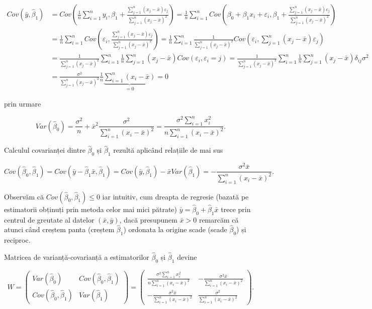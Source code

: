 \documentclass[]{article}
\begin{document}
\begin{align*}
Cov(\bar y, \hat \beta_1) &= Cov\left(\frac{1}{n}\sum_{i = 1}^{n}y_i, \beta_1 + \frac{\sum_{j = 1}^{n}(x_j - \bar x)\varepsilon_j}{\sum_{j = 1}^{n}(x_j - \bar x)^2} \right) = \frac{1}{n}\sum_{i = 1}^{n}Cov\left(\beta_0 + \beta_1 x_i + \varepsilon_i, \beta_1 + \frac{\sum_{j = 1}^{n}(x_j - \bar x)\varepsilon_j}{\sum_{j = 1}^{n}(x_j - \bar x)^2}\right)\\
&= \frac{1}{n}\sum_{i = 1}^{n}Cov\left(\varepsilon_i, \frac{\sum_{j = 1}^{n}(x_j - \bar x)\varepsilon_j}{\sum_{j = 1}^{n}(x_j - \bar x)^2}\right) = \frac{1}{n}\sum_{i = 1}^{n}\frac{1}{\sum_{j = 1}^{n}(x_j - \bar x)^2}Cov\left(\varepsilon_i, \sum_{j = 1}^{n}(x_j - \bar x)\varepsilon_j\right)\\
&= \frac{1}{\sum_{j = 1}^{n}(x_j - \bar x)^2}\sum_{i = 1}^{n}\frac{1}{n}\sum_{j = 1}^{n}(x_j - \bar x)Cov(\varepsilon_i, \varepsilon_i=j) = \frac{1}{\sum_{j = 1}^{n}(x_j - \bar x)^2}\sum_{i = 1}^{n}\frac{1}{n}\sum_{j = 1}^{n}(x_j - \bar x)\delta_{ij}\sigma^2\\
&= \frac{\sigma^2}{\sum_{j = 1}^{n}(x_j - \bar x)^2}\frac{1}{n}\underbrace{\sum_{i = 1}^{n}(x_i - \bar x)}_{=0} = 0
\end{align*}

prin urmare

\[
Var(\hat \beta_0) = \frac{\sigma^2}{n} + \bar x^2 \frac{\sigma^2}{\sum_{i = 1}^{n}(x_i - \bar x)^2} = \frac{\sigma^2\sum_{i = 1}^{n}x_i^2}{n\sum_{i = 1}^{n}(x_i - \bar x)^2}.
\]

Calculul covarianței dintre \(\hat \beta_0\) și \(\hat \beta_1\) rezultă
aplicând relațiile de mai sus

\[
Cov(\hat \beta_0, \hat \beta_1) = Cov(\bar y - \hat \beta_1\bar x, \hat \beta_1) = Cov(\bar y, \hat \beta_1) - \bar x Var(\hat \beta_1) = -\frac{\sigma^2 \bar x}{\sum_{i = 1}^{n}(x_i - \bar x)^2}.
\]

Observăm că \(Cov(\hat \beta_0, \hat \beta_1)\leq 0\) iar intuitiv, cum
dreapta de regresie (bazată pe estimatorii obținuți prin metoda celor
mai mici pătrate) \(\bar y = \hat\beta_0 + \hat\beta_1 \bar x\) trece
prin centrul de greutate al datelor \((\bar x, \bar y)\), dacă
presupunem \(\bar x > 0\) remarcăm că atunci când creștem panta (creștem
\(\hat\beta_1\)) ordonata la origine scade (scade \(\hat\beta_0\)) și
reciproc.

Matricea de varianță-covarianță a estimatorilor \(\hat\beta_0\) și
\(\hat\beta_1\) devine

\[
W = \begin{pmatrix}Var(\hat \beta_0) & Cov(\hat \beta_0, \hat \beta_1)\\ Cov(\hat \beta_0, \hat \beta_1) & Var(\hat \beta_1)\end{pmatrix} = \begin{pmatrix}\frac{\sigma^2\sum_{i = 1}^{n}x_i^2}{n\sum_{i = 1}^{n}(x_i - \bar x)^2} & -\frac{\sigma^2 \bar x}{\sum_{i = 1}^{n}(x_i - \bar x)^2}\\ -\frac{\sigma^2 \bar x}{\sum_{i = 1}^{n}(x_i - \bar x)^2} & \frac{\sigma^2}{\sum_{i = 1}^{n}(x_i - \bar x)^2}\end{pmatrix}.
\]
\end{document}
